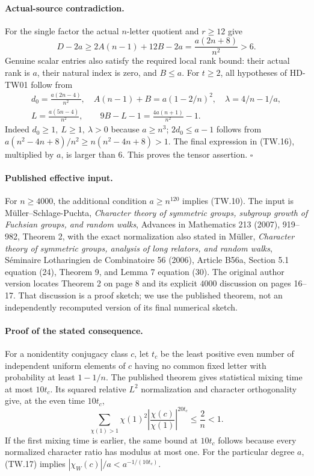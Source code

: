 \paragraph{Actual-source contradiction.}
For the single factor the actual \(n\)-letter quotient and \(r\ge12\) give
\[
 D-2a\ge2A(n-1)+12B-2a
       =\frac{a(2n+8)}{n^2}>6 .
 \tag{TW.15}
\]
Genuine scalar entries also satisfy the required local rank bound:
their actual rank is \(a\), their natural index is zero, and \(B\le a\).
For \(t\ge2\), all hypotheses of HD-TW01 follow from
\[
 \begin{gathered}
 d_0=\frac{a(2n-4)}{n^2},\quad
 A(n-1)+B=a(1-2/n)^2,\quad
 \lambda=4/n-1/a,\\
 L=\frac{a(5n-4)}{n^2},\qquad
 9B-L-1=\frac{4a(n+1)}{n^2}-1 .
 \end{gathered}\tag{TW.16}
\]
Indeed \(d_0\ge1,\ L\ge1,\ \lambda>0\) because \(a\ge n^3\);
\(2d_0\le a-1\) follows from
\(a(n^2-4n+8)/n^2\ge n(n^2-4n+8)>1\).
The final expression in (TW.16), multiplied by \(a\), is larger than \(6\).
This proves the tensor assertion. \(\square\)

\paragraph{Published effective input.}
For \(n\ge4000\), the additional condition \(a\ge n^{120}\) implies
(TW.10).
The input is M\"uller--Schlage-Puchta,
\emph{Character theory of symmetric groups, subgroup growth of Fuchsian
groups, and random walks}, Advances in Mathematics 213 (2007), 919--982,
Theorem 2, with the exact normalization also stated in M\"uller,
\emph{Character theory of symmetric groups, analysis of long relators,
and random walks}, S\'eminaire Lotharingien de Combinatoire 56 (2006),
Article B56a, Section 5.1 equation (24), Theorem 9, and Lemma 7 equation (30).
The original author version locates Theorem 2 on page 8 and its explicit
\(4000\) discussion on pages 16--17.  That discussion is a proof sketch;
we use the published theorem, not an independently recomputed version of
its final numerical sketch.\cite{HD:MSP2007,HD:MullerSLC2006}

\paragraph{Proof of the stated consequence.}
For a nonidentity conjugacy class \(c\), let \(t_c\) be the least positive
even number of independent uniform elements of \(c\) having no common
fixed letter with probability at least \(1-1/n\).
The published theorem gives statistical mixing time at most \(10t_c\).
Its squared relative \(L^2\) normalization and character orthogonality give,
at the even time \(10t_c\),
\[
 \sum_{\chi(1)>1}\chi(1)^2
       \left|\frac{\chi(c)}{\chi(1)}\right|^{20t_c}
       \le \frac2n<1 .
 \tag{TW.17}
\]
If the first mixing time is earlier, the same bound at \(10t_c\) follows
because every normalized character ratio has modulus at most one.
For the particular degree \(a\), (TW.17) implies
\(|\chi_W(c)|/a<a^{-1/(10t_c)}\).

